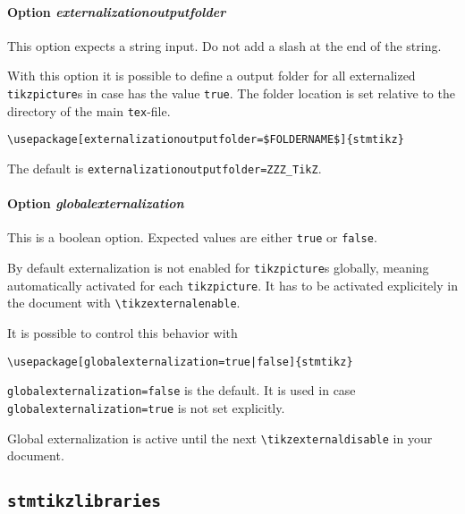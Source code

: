 \documentclass{scrartcl}
\begin{document}
\paragraph{Option \protect\textit{externalizationoutputfolder}}
\label{sec:usage:preamble:wholepackage:options:outputfolder}

This option expects a string input. Do not add a slash at the end of the string.

With this option it is possible to define a output folder for all externalized \texttt{tikzpicture}s in case  has the value \texttt{true}. The folder location is set relative to the directory of the main \texttt{tex}-file.

\begin{verbatim}
\usepackage[externalizationoutputfolder=$FOLDERNAME$]{stmtikz}
\end{verbatim}

The default is \texttt{externalizationoutputfolder=ZZZ\_TikZ}.

\paragraph{Option \protect\textit{globalexternalization}}
\label{sec:usage:preamble:wholepackage:options:globalexternalization}

This is a boolean option.  Expected values are either \texttt{true} or \texttt{false}. 

By default externalization is not enabled for \texttt{tikzpicture}s globally, meaning automatically activated for each \texttt{tikzpicture}. It has to be activated explicitely in the document with \texttt{\textbackslash tikzexternalenable}.

It is possible to control this behavior with 

\begin{verbatim}
\usepackage[globalexternalization=true|false]{stmtikz}
\end{verbatim}

\texttt{globalexternalization=false} is the default. It is used in case \texttt{globalexternalization=true} is not set explicitly.

Global externalization is active until the next \texttt{\textbackslash tikzexternaldisable} in your document.

\subsection{\protect\texttt{stmtikzlibraries}}
\label{sec:usage:preamble:libraries}
\end{document}
